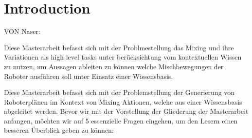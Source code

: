 \chapter*{Introduction}

VON Naser:

Diese Masterarbeit befasst sich mit der Problmestellung das Mixing und ihre Variationen als high level tasks unter berücksichtung vom kontextuellen Wissen zu nutzen,
um Aussagen ableiten zu können welche Mischbewegungen der Roboter ausführen soll unter Einsatz einer Wissensbasis.


Diese Masterarbeit befasst sich mit der Problemstellung der Generierung von Roboterplänen im Kontext von Mixing Aktionen, welche aus einer Wissensbasis abgeleitet werden.
Bevor wir mit der Vorstellung der Gliederung der Masterarbeit anfangen, möchten wir auf 5 essenzielle Fragen eingehen, um den Lesern einen besseren Überblick geben zu können:
